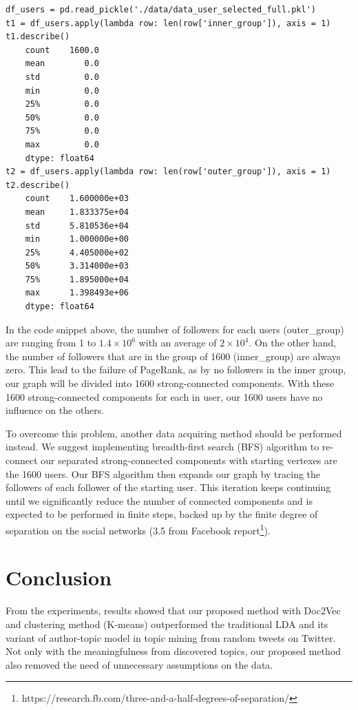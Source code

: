 \documentclass[11pt]{article}
\begin{document}
\begin{listing}[H]
    \begin{verbatim}
df_users = pd.read_pickle('./data/data_user_selected_full.pkl')
t1 = df_users.apply(lambda row: len(row['inner_group']), axis = 1)
t1.describe()
    count    1600.0
    mean        0.0
    std         0.0
    min         0.0
    25%         0.0
    50%         0.0
    75%         0.0
    max         0.0
    dtype: float64
t2 = df_users.apply(lambda row: len(row['outer_group']), axis = 1)
t2.describe()
    count    1.600000e+03
    mean     1.833375e+04
    std      5.810536e+04
    min      1.000000e+00
    25%      4.405000e+02
    50%      3.314000e+03
    75%      1.895000e+04
    max      1.398493e+06
    dtype: float64
    \end{verbatim}
\end{listing}

In the code snippet above, the number of followers for each users (outer\_group) are ranging from 1 to $1.4\times 10^6$ with an average of $2\times 10^4$. On the other hand, the number of followers that are in the group of 1600 (inner\_group) are always zero. This lead to the failure of PageRank, as by no followers in the inner group, our graph will be divided into 1600 strong-connected components. With these 1600 strong-connected components for each in user, our 1600 users have no influence on the others.

To overcome this problem, another data acquiring method should be performed instead. We suggest implementing breadth-first search (BFS) algorithm to re-connect our separated strong-connected components with starting vertexes are the 1600 users. Our BFS algorithm then expands our graph by tracing the followers of each follower of the starting user. This iteration keeps continuing until we significantly reduce the number of connected components and is expected to be performed in finite steps, backed up by the finite degree of separation on the social networks (3.5 from Facebook report\footnote{https://research.fb.com/three-and-a-half-degrees-of-separation/}).

\section{Conclusion}
From the experiments, results showed that our proposed method with Doc2Vec and clustering method (K-means) outperformed the traditional LDA and its variant of author-topic model in topic mining from random tweets on Twitter. Not only with the meaningfulness from discovered topics, our proposed method also removed the need of unnecessary assumptions on the data.
\end{document}
